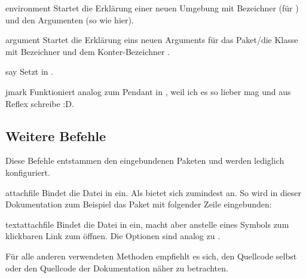 \documentclass{sopra-base}
\begin{document}
\begin{environment}{environment}{}
    Startet die Erklärung einer neuen Umgebung mit Bezeichner  (für ) und den Argumenten  (so wie hier).
\end{environment}

\begin{environment}{argument}{}
    Startet die Erklärung eins neuen Arguments für das Paket/die Klasse mit Bezeichner  und dem Konter-Bezeichner .
\end{environment}

\begin{command}{say}{}
    Setzt  in .
\end{command}

\begin{command}{jmark}{}
    Funktioniert analog zum Pendant in , weil ich es so lieber mag und aus Reflex schreibe :D.
\end{command}

\subsection{Weitere Befehle}

Diese Befehle entstammen den eingebundenen Paketen und werden lediglich konfiguriert.

\begin{command}{attachfile}{}
    Bindet die Datei in  ein. Als  bietet sich zumindest  an. So wird in dieser Dokumentation zum Beispiel das Paket mit folgender Zeile eingebunden:
\begin{plainlatex}
\end{plainlatex}
\end{command}

\begin{command}{textattachfile}{}
    Bindet die Datei in  ein, macht aber anstelle eines Symbols  zum klickbaren Link zum öffnen. Die Optionen sind analog zu .
\end{command}

Für alle anderen verwendeten Methoden empfiehlt es sich, den Quellcode selbst oder den Quellcode der Dokumentation näher zu betrachten.
\end{document}
